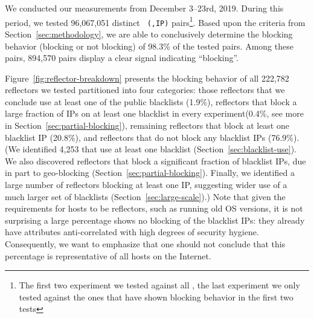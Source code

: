 

We conducted our measurements from December 3--23rd, 2019.  During
this period, we tested 96,067,051 distinct \texttt{\small
  ({},IP)} pairs\footnote{The first two experiment we tested against
  all {}, the last experiment we only tested against the ones that
  have shown blocking behavior in the first two tests}.
Based upon the criteria from
Section~\ref{sec:methodology}, we are able to conclusively determine
the blocking behavior (blocking or not blocking) of 98.3\% of the
tested pairs.  Among these pairs, 894,570 pairs display a
clear signal indicating ``blocking''.

Figure~\ref{fig:reflector-breakdown} presents the blocking behavior of
all 222,782 reflectors we tested partitioned into four categories:
those reflectors that we conclude use at least one of the public
blacklists (1.9\%), reflectors that block a large fraction of IPs on
at least one blacklist in every experiment(0.4\%, see more in
Section~\ref{sec:partial-blocking}), remaining reflectors that block at
least one blacklist IP (20.8\%), and reflectors that do not block any
blacklist IPs (76.9\%). (We identified 4,253 {} that use at
  least one blacklist (Section~\ref{sec:blacklist-use}).  We also
  discovered reflectors that block a significant fraction of blacklist
  IPs, due in part to geo-blocking
  (Section~\ref{sec:partial-blocking}).  Finally, we identified a
  large number of reflectors blocking at least one IP, suggesting
  wider use of a much larger set of blacklists
  (Section~\ref{sec:large-scale}).) Note that given the requirements for hosts to
be reflectors, such as running old OS versions, it is not surprising a
large percentage shows no blocking of the blacklist IPs: they already
have attributes anti-correlated with high degrees of security hygiene.
Consequently, we want to emphasize that one should not conclude that
this percentage is representative of all hosts on the Internet.

